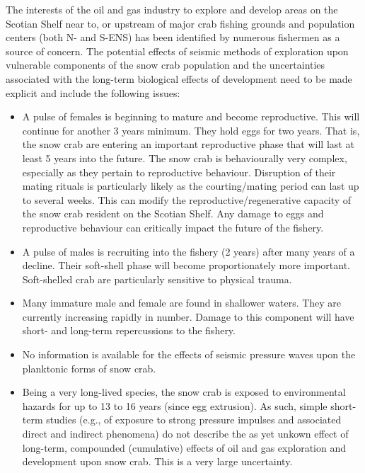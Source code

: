 \documentclass[11pt]{article}
\begin{document}
The interests of the oil and gas industry to explore and develop areas on the Scotian Shelf near to, or upstream of major crab fishing grounds and population centers (both N- and S-ENS) has been identified by numerous fishermen as a source of concern. The potential effects of seismic methods of exploration upon vulnerable components of the snow crab population and the uncertainties associated with the long-term biological effects of development need to be made explicit and include the following issues:

\begin{itemize}

\item A pulse of females is beginning to mature and become reproductive. This will continue for another 3 years minimum. They hold eggs for two years. That is, the snow crab are entering an important reproductive phase that will last at least 5 years into the future. The snow crab is behaviourally very complex, especially as they pertain to reproductive behaviour. Disruption of their mating rituals is particularly likely as the courting/mating period can last up to several weeks. This can modify the reproductive/regenerative capacity of the snow crab resident on the Scotian Shelf. Any damage to eggs and reproductive behaviour can critically impact the future of the fishery.

\item A pulse of males is recruiting into the fishery (2 years) after many years of a decline. Their soft-shell phase will become proportionately more important. Soft-shelled crab are particularly sensitive to physical trauma.

\item Many immature male and female are found in shallower waters. They are currently increasing rapidly in number. Damage to this component will have short- and long-term repercussions to the fishery.

\item No information is available for the effects of seismic pressure waves upon the planktonic forms of snow crab.

\item Being a very long-lived species, the snow crab is exposed to environmental hazards for up to 13 to 16 years (since egg extrusion). As such, simple short-term studies (e.g., of exposure to strong pressure
impulses and associated direct and indirect phenomena) do not describe the as yet unkown effect of long-term, compounded (cumulative) effects of oil and gas exploration and development upon snow crab. This is a very large uncertainty.


\end{itemize}
\end{document}
